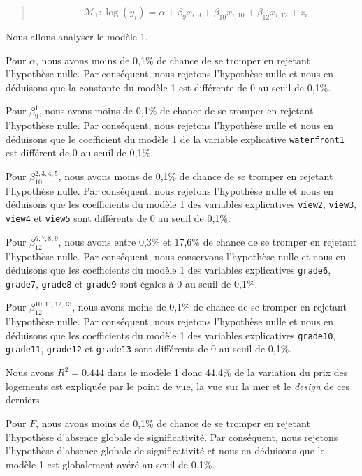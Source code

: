 \documentclass[
  11pt,
  french,
]{article}
\begin{document}
\begin{quote}
\[\mathcal{M}_{1}:\log(y_{i})=\alpha+\beta_{9}x_{i,9}+\beta_{10}x_{i,10}+\beta_{12}x_{i,12}+z_{i}\]
\end{quote}

Nous allons analyser le modèle 1.

Pour \(\alpha\), nous avons moins de 0,1\% de chance de se tromper en
rejetant l'hypothèse nulle. Par conséquent, nous rejetons l'hypothèse
nulle et nous en déduisons que la constante du modèle 1 est différente
de 0 au seuil de 0,1\%.

Pour \(\beta_{9}^{1}\), nous avons moins de 0,1\% de chance de se
tromper en rejetant l'hypothèse nulle. Par conséquent, nous rejetons
l'hypothèse nulle et nous en déduisons que le coefficient du modèle 1 de
la variable explicative \texttt{waterfront1} est différent de 0 au seuil
de 0,1\%.

Pour \(\beta_{10}^{2,3,4,5}\), nous avons moins de 0,1\% de chance de se
tromper en rejetant l'hypothèse nulle. Par conséquent, nous rejetons
l'hypothèse nulle et nous en déduisons que les coefficients du modèle 1
des variables explicatives \texttt{view2}, \texttt{view3},
\texttt{view4} et \texttt{view5} sont différents de 0 au seuil de 0,1\%.

Pour \(\beta_{12}^{6,7,8,9}\), nous avons entre 0,3\% et 17,6\% de
chance de se tromper en rejetant l'hypothèse nulle. Par conséquent, nous
conservons l'hypothèse nulle et nous en déduisons que les coefficients
du modèle 1 des variables explicatives \texttt{grade6}, \texttt{grade7},
\texttt{grade8} et \texttt{grade9} sont égales à 0 au seuil de 0,1\%.

Pour \(\beta_{12}^{10,11,12,13}\), nous avons moins de 0,1\% de chance
de se tromper en rejetant l'hypothèse nulle. Par conséquent, nous
rejetons l'hypothèse nulle et nous en déduisons que les coefficients du
modèle 1 des variables explicatives \texttt{grade10}, \texttt{grade11},
\texttt{grade12} et \texttt{grade13} sont différents de 0 au seuil de
0,1\%.

Nous avons \(R^{2}=0.444\) dans le modèle 1 donc 44,4\% de la variation
du prix des logements est expliquée par le point de vue, la vue sur la
mer et le \textit{design} de ces derniers.

Pour \(F\), nous avons moins de 0,1\% de chance de se tromper en
rejetant l'hypothèse d'absence globale de significativité. Par
conséquent, nous rejetons l'hypothèse d'absence globale de
significativité et nous en déduisons que le modèle 1 est globalement
avéré au seuil de 0,1\%.
\end{document}
